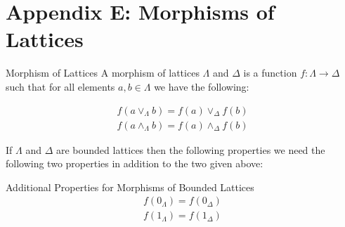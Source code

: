 \section*{Appendix E: Morphisms of Lattices}


\begin{defn}{Morphism of Lattices}
    A morphism of lattices $\Lambda$ and $\Delta$ is a function $f: \Lambda \rightarrow \Delta$ such that for all elements $a,b \in \Lambda$ we have the following:
    
    \begin{align*}
        f(a \vee_{\Lambda} b) = f(a) \vee_{\Delta} f(b) \\
        f(a \wedge_{\Lambda} b) = f(a) \wedge_{\Delta} f(b)
    \end{align*}
\end{defn}


If $\Lambda$ and $\Delta$ are bounded lattices then the following properties we need the following two properties in addition to the two given above:


\begin{defn}{Additional Properties for Morphisms of Bounded Lattices}
    \begin{align*}
         f(0_{\Lambda}) = f(0_{\Delta}) \\
         f(1_{\Lambda}) = f(1_{\Delta})
    \end{align*}
\end{defn}

    